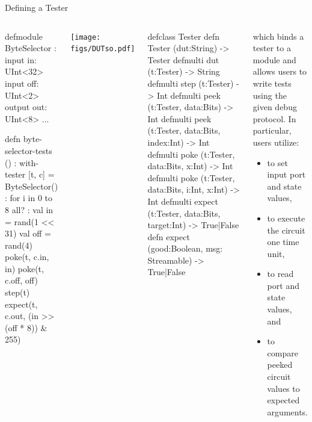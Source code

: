 \documentclass[xcolor=pdflatex,dvipsnames,table]{beamer}
\begin{document}
\begin{frame}[fragile]{Defining a Tester}

\begin{columns}
{
\begin{stanza}
defmodule ByteSelector :
  input in: UInt<32>
  input off: UInt<2>
  output out: UInt<8>
  ...

defn byte-selector-tests () :
  with-tester [t, c] = ByteSelector() :
    for i in 0 to 8 all? :
      val in  = rand(1 << 31)
      val off = rand(4)
      poke(t, c.in,  in)
      poke(t, c.off, off)
      step(t)
      expect(t, c.out, (in >> (off * 8)) & 255)
\end{stanza}
}
\begin{center}
\texttt{[image: figs/DUTso.pdf]}
\end{center}

{
\begin{stanza}
defclass Tester
defn Tester (dut:String) -> Tester
defmulti dut (t:Tester) -> String
defmulti step (t:Tester) -> Int
defmulti peek (t:Tester, data:Bits) -> Int
defmulti peek (t:Tester, data:Bits, index:Int) -> Int
defmulti poke (t:Tester, data:Bits, x:Int) -> Int
defmulti poke (t:Tester, data:Bits, i:Int, x:Int) -> Int
defmulti expect (t:Tester, data:Bits, target:Int) -> True|False
defn expect (good:Boolean, msg: Streamable) -> True|False
\end{stanza}
}
\begin{tiny}
\noindent
which binds a tester to a module
and allows users to write tests using the given debug protocol.  In particular, users utilize:
\begin{itemize}
\item {} to set input port and state values,
\item {} to execute the circuit one time unit,
\item {} to read port and state values, and
\item {} to compare peeked circuit values to expected arguments.
\end{itemize}
\end{tiny}

\end{columns}
\end{frame}
\end{document}
